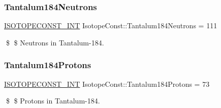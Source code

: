 \subsubsection{\texorpdfstring{Tantalum184\+Neutrons}{Tantalum184Neutrons}}
{\footnotesize\ttfamily \mbox{\hyperlink{group___isotope_const-_macros_ga5f18360b3e99483a35c32d789e62621c}{I\+S\+O\+T\+O\+P\+E\+C\+O\+N\+S\+T\+\_\+\+I\+NT}} Isotope\+Const\+::\+Tantalum184\+Neutrons = 111}

\$ \$ Neutrons in Tantalum-\/184. \mbox{\label{group___isotope_const-_tantalum-_ta184_gaf538326e41852f97080f722653cc845b}} 
\subsubsection{\texorpdfstring{Tantalum184\+Protons}{Tantalum184Protons}}
{\footnotesize\ttfamily \mbox{\hyperlink{group___isotope_const-_macros_ga5f18360b3e99483a35c32d789e62621c}{I\+S\+O\+T\+O\+P\+E\+C\+O\+N\+S\+T\+\_\+\+I\+NT}} Isotope\+Const\+::\+Tantalum184\+Protons = 73}

\$ \$ Protons in Tantalum-\/184. 